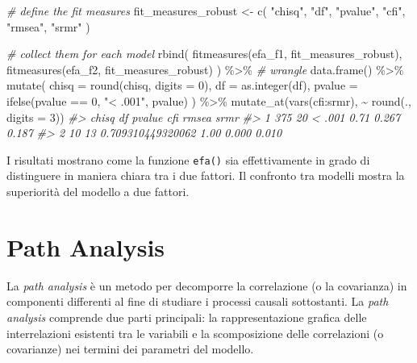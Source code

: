 \documentclass[
  11pt,
]{krantz}
\makeatletter
\newenvironment{Shaded}{\begin{snugshade}}{\end{snugshade}}
\newcommand{\AttributeTok}[1]{\textcolor[rgb]{0.61,0.61,0.61}{#1}}
\newcommand{\CommentTok}[1]{\textcolor[rgb]{0.37,0.37,0.37}{\textit{#1}}}
\newcommand{\DecValTok}[1]{\textcolor[rgb]{0.06,0.06,0.06}{#1}}
\newcommand{\FunctionTok}[1]{\textcolor[rgb]{0,0,0}{#1}}
\newcommand{\NormalTok}[1]{#1}
\newcommand{\OtherTok}[1]{\textcolor[rgb]{0.37,0.37,0.37}{#1}}
\newcommand{\SpecialCharTok}[1]{\textcolor[rgb]{0,0,0}{#1}}
\newcommand{\StringTok}[1]{\textcolor[rgb]{0.5,0.5,0.5}{#1}}
\newenvironment{kframe}{%
\medskip{}
\setlength{\fboxsep}{.8em}
 \def\at@end@of@kframe{}%
 \ifinner\ifhmode%
  \def\at@end@of@kframe{\end{minipage}}%
  \begin{minipage}{\columnwidth}%
 \fi\fi%
 \def\FrameCommand##1{\hskip\@totalleftmargin \hskip-\fboxsep
 \colorbox{shadecolor}{##1}\hskip-\fboxsep
     \hskip-\linewidth \hskip-\@totalleftmargin \hskip\columnwidth}%
 \MakeFramed {\advance\hsize-\width
   \@totalleftmargin\z@ \linewidth\hsize
   \@setminipage}}%
 {\par\unskip\endMakeFramed%
 \at@end@of@kframe}
\renewenvironment{Shaded}{\begin{kframe}}{\end{kframe}}
\theoremstyle{definition}
\theoremstyle{definition}
\theoremstyle{definition}
\theoremstyle{definition}
\theoremstyle{remark}
\makeatother
\begin{document}
\begin{Shaded}
\begin{Highlighting}[]
\CommentTok{\# define the fit measures}
\NormalTok{fit\_measures\_robust }\OtherTok{\textless{}{-}} \FunctionTok{c}\NormalTok{(}
  \StringTok{"chisq"}\NormalTok{, }\StringTok{"df"}\NormalTok{, }\StringTok{"pvalue"}\NormalTok{,}
  \StringTok{"cfi"}\NormalTok{, }\StringTok{"rmsea"}\NormalTok{, }\StringTok{"srmr"}
\NormalTok{)}

\CommentTok{\# collect them for each model}
\FunctionTok{rbind}\NormalTok{(}
  \FunctionTok{fitmeasures}\NormalTok{(efa\_f1, fit\_measures\_robust),}
  \FunctionTok{fitmeasures}\NormalTok{(efa\_f2, fit\_measures\_robust)}
\NormalTok{) }\SpecialCharTok{\%\textgreater{}\%}
  \CommentTok{\# wrangle}
  \FunctionTok{data.frame}\NormalTok{() }\SpecialCharTok{\%\textgreater{}\%}
  \FunctionTok{mutate}\NormalTok{(}
    \AttributeTok{chisq =} \FunctionTok{round}\NormalTok{(chisq, }\AttributeTok{digits =} \DecValTok{0}\NormalTok{),}
    \AttributeTok{df =} \FunctionTok{as.integer}\NormalTok{(df),}
    \AttributeTok{pvalue =} \FunctionTok{ifelse}\NormalTok{(pvalue }\SpecialCharTok{==} \DecValTok{0}\NormalTok{, }\StringTok{"\textless{} .001"}\NormalTok{, pvalue)}
\NormalTok{  ) }\SpecialCharTok{\%\textgreater{}\%}
  \FunctionTok{mutate\_at}\NormalTok{(}\FunctionTok{vars}\NormalTok{(cfi}\SpecialCharTok{:}\NormalTok{srmr), }\SpecialCharTok{\textasciitilde{}} \FunctionTok{round}\NormalTok{(., }\AttributeTok{digits =} \DecValTok{3}\NormalTok{))}
\CommentTok{\#\textgreater{}   chisq df            pvalue  cfi rmsea  srmr}
\CommentTok{\#\textgreater{} 1   375 20            \textless{} .001 0.71 0.267 0.187}
\CommentTok{\#\textgreater{} 2    10 13 0.709310449320062 1.00 0.000 0.010}
\end{Highlighting}
\end{Shaded}

I risultati mostrano come la funzione \texttt{efa()} sia effettivamente in grado di distinguere in maniera chiara tra i due fattori. Il confronto tra modelli mostra la superiorità del modello a due fattori.

\hypertarget{ch:path_analysis}{%
\chapter{Path Analysis}\label{ch:path_analysis}}

La \emph{path analysis} è un metodo per decomporre la correlazione (o la covarianza) in componenti differenti al fine di studiare i processi causali sottostanti. La \emph{path analysis} comprende due parti principali: la rappresentazione grafica delle interrelazioni esistenti tra le variabili e la scomposizione delle correlazioni (o covarianze) nei termini dei parametri del modello.
\end{document}
